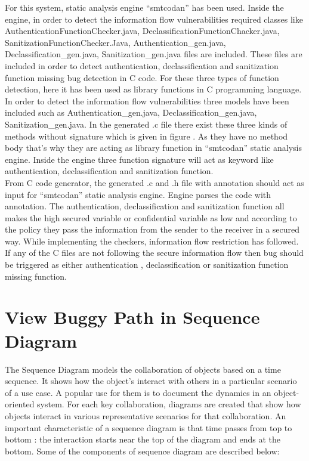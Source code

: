 For this system, static analysis engine \enquote{smtcodan}  has been used. Inside the engine, in order to detect the information flow vulnerabilities required classes like AuthenticationFunctionChecker.java, DeclassificationFunctionChacker.java, SanitizationFunctionChecker.Java, Authentication\_gen.java,\\
Declassification\_gen.java,
Sanitization\_gen.java files are included. These files are included in order to detect authentication, declassification and sanitization function missing bug detection in C code. For these three types of function detection, here it has been used as library functions in C programming language. In order to detect the information flow vulnerabilities three models have been included such as Authentication\_gen.java,
Declassification\_gen.java,
Sanitization\_gen.java. In the generated .c file there exist these three kinds of methods without signature which is given in figure . As they have no method body that's why they are acting as library function in \enquote{smtcodan} static analysis engine. Inside the engine three function signature will act as keyword like authentication, declassification and sanitization function. \\

From C code generator, the generated .c and .h file with annotation should act as input for \enquote{smtcodan} static analysis engine. Engine parses the code with annotation. The authentication, declassification and sanitization function all makes the high secured variable or confidential variable as low and according to the policy they pass the information from the sender to the receiver in a secured way. While implementing the checkers, information flow restriction has followed. If any of the C files are not following the secure information flow then bug should be triggered as either authentication , declassification or sanitization function missing function.

\section{View Buggy Path in Sequence Diagram}

The Sequence Diagram models the collaboration of objects based on a time sequence. It shows how the object's interact with others in a particular scenario of a use case. A popular use for them is to document the dynamics in an object-oriented system.  For each key collaboration, diagrams are created that show how objects interact in various representative scenarios for that collaboration. An important characteristic of a sequence diagram is that time passes from top to bottom : the interaction starts near the top of the diagram and ends at the bottom. Some of the components of sequence diagram \cite{ref_107_visual-paradigm:visual-paradigm} are described below:

